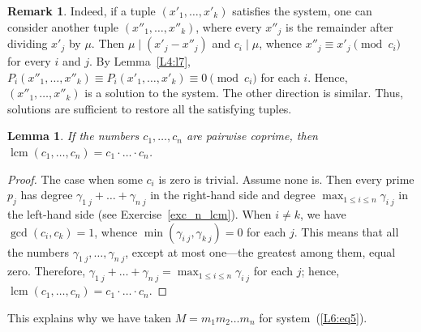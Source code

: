 \documentclass[12pt,notitlepage]{article}
\theoremstyle{plain}
\newtheorem{lemma}[thm]{Lemma}
\theoremstyle{definition}
\newtheorem{rem}[thm]{Remark}
\theoremstyle{plain}
\newcommand{\1}{\mathbf{1}}
\newcommand{\0}{\mathbf{0}}
\newcommand{\dvd}{\mathop{\mid}}
\DeclareMathOperator{\lcm}{lcm}
\begin{document}
\begin{rem}
Indeed, if a tuple $(x'_1, \ldots, x'_k)$ satisfies the system, one can consider another tuple $(x''_1, \ldots, x''_k)$, where every $x''_j$ is the remainder after dividing $x'_j$ by $\mu$. Then $\mu \dvd (x'_j - x''_j)$ and $c_i \dvd \mu$, whence $x''_j \equiv x'_j \pmod {c_i}$ for every $i$ and $j$. By Lemma~\ref{L4:l7}, $P_i(x''_1,\ldots, x''_k) \equiv P_i(x'_1,\ldots, x'_k) \equiv 0 \pmod {c_i}$ for each $i$. Hence, $(x''_1, \ldots, x''_k)$ is a solution to the system. The other direction is similar. Thus, solutions are sufficient to restore all the satisfying tuples.
\begin{lemma}\label{congr:lcm}
If the numbers $c_1, \ldots, c_n$ are pairwise coprime, then $\lcm(c_1, \ldots, c_n) = c_1 \cdot \ldots \cdot c_n$. 
\end{lemma}
\begin{proof}
The case when some $c_i$ is zero is trivial. Assume none is. Then every prime $p_j$ has degree $\gamma_{1\; j} + \ldots + \gamma_{n\; j}$ in the right-hand side and degree $\max_{1 \leq i \leq n} \gamma_{i\; j}$ in the left-hand side (see Exercise~\ref{exc_n_lcm}). When $i \neq k$, we have $\gcd(c_i, c_k) = 1$, whence $\min(\gamma_{i\; j}, \gamma_{k\; j}) = 0$ for each $j$. This means that all the numbers $\gamma_{1\; j}, \ldots, \gamma_{n\; j}$, except at most one---the greatest among them, equal zero. Therefore, $\gamma_{1\; j} + \ldots + \gamma_{n\; j} = \max_{1 \leq i \leq n} \gamma_{i\; j}$ for each $j$; hence, $\lcm(c_1, \ldots, c_n) = c_1 \cdot \ldots \cdot c_n$.
\end{proof}
\noindent This explains why we have taken $M = m_1 m_2 \ldots m_n$ for system~(\ref{L6:eq5}).
\end{rem}
\end{document}
